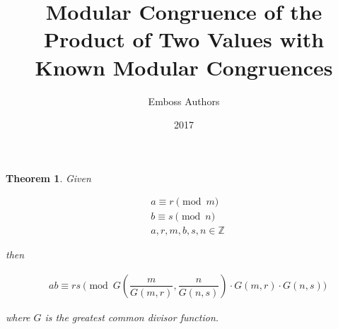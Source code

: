 \documentclass{article}
\title{Modular Congruence of the Product of Two Values with Known Modular Congruences}
\author{Emboss Authors}
\date{2017}
\begin{document}
\maketitle

\newtheorem{theorem}{Theorem}


\begin{theorem}
Given

\begin{align*}
  &{a} \equiv {r} \pmod{{m}} \\
  &{b} \equiv {s} \pmod{{n}} \\
  &{a}, {r}, {m}, {b}, {s}, {n} \in \mathbb{Z}
\end{align*}

then

\begin{align*}
  &{a}{b} \equiv {r}{s} \pmod{G\left(\dfrac{{m}}{G\left({m}, {r}\right)},
\dfrac{{n}}{G\left({n}, {s}\right)}\right) \cdot G\left({m}, {r}\right) \cdot
G\left({n}, {s}\right)}
\end{align*}

where $G$ is the greatest common divisor function.
\end{theorem}
\end{document}
